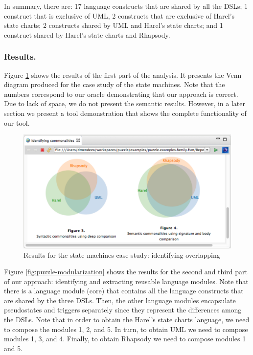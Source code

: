 In summary, there are: 17 language constructs that are shared by all the DSLs; 1 construct that is exclusive of UML, 2 constructs that are exclusive of Harel's state charts; 2 constructs shared by UML and Harel's state charts; and 1 construct shared by Harel's state charts and Rhapsody. 

\vspace{-2mm}
\subsubsection{Results.} Figure \ref{fig:puzzle-overlapping} shows the results of the first part of the analysis. It presents the Venn diagram produced for the case study of the state machines. Note that the numbers correspond to our oracle demonstrating that our approach is correct. Due to lack of space, we do not present the semantic results. However, in a later section we present a tool demonstration that shows the complete functionality of our tool.

\begin{figure}
\centering
\includegraphics[width=1\linewidth]{images/puzzle-overlapping.pdf}
\caption{Results for the state machines case study: identifying overlapping}
\label{fig:puzzle-overlapping}
\end{figure}

Figure \ref{fig:puzzle-modularization} shows the results for the second and third part of our approach: identifying and extracting reusable language modules. Note that there is a language module (core) that contains all the language constructs that are shared by the three DSLs. Then, the other language modules encapsulate pseudostates and triggers separately since they represent the differences among the DSLs. Note that in order to obtain the Harel's state charts language, we need to compose the modules 1, 2, and 5. In turn, to obtain UML we need to compose modules 1, 3, and 4. Finally, to obtain Rhapsody we need to compose modules 1 and 5.

